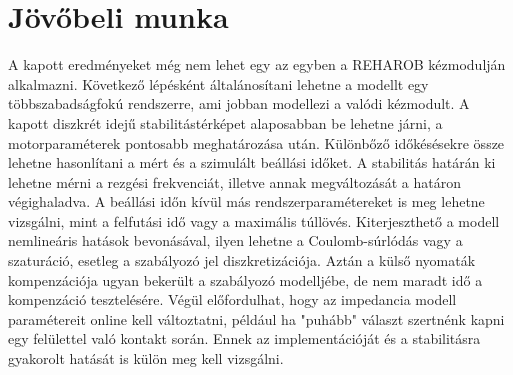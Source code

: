 \chapter{Jövőbeli munka}\label{chap:conclusion}

A kapott eredményeket még nem lehet egy az egyben a REHAROB kézmodulján alkalmazni. Következő 
lépésként általánosítani lehetne a modellt egy többszabadságfokú rendszerre, ami jobban modellezi 
a valódi kézmodult. A kapott diszkrét idejű stabilitástérképet alaposabban be lehetne járni, 
a motorparaméterek pontosabb meghatározása után. Különbőző időkésésekre össze lehetne hasonlítani 
a mért és a szimulált beállási időket. A stabilitás határán ki lehetne mérni a rezgési frekvenciát, 
illetve annak megváltozását a határon végighaladva. A beállási időn kívül más rendszerparamétereket 
is meg lehetne vizsgálni, mint a felfutási idő vagy a maximális túllövés. Kiterjeszthető a modell 
nemlineáris hatások bevonásával, ilyen lehetne a Coulomb-súrlódás vagy a szaturáció, esetleg a 
szabályozó jel diszkretizációja. Aztán a külső nyomaták kompenzációja ugyan bekerült a 
szabályozó modelljébe, de nem maradt idő a kompenzáció tesztelésére. Végül előfordulhat, 
hogy az impedancia modell paramétereit online kell változtatni, például ha "puhább" választ 
szertnénk kapni egy felülettel való kontakt során. Ennek az implementációját és a stabilitásra 
gyakorolt hatását is külön meg kell vizsgálni.
